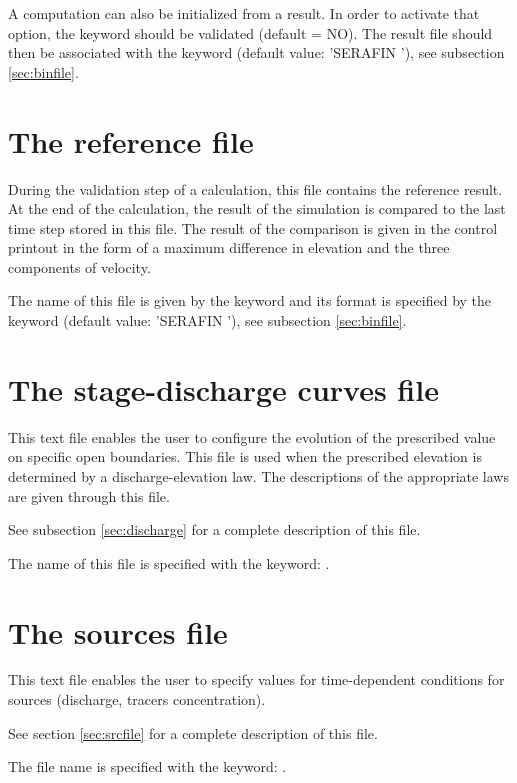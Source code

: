 A computation can also be initialized from a  result. In order to
activate that option, the  keyword
should be validated (default = NO).
The  result file should then be associated with
the  keyword (default
value: 'SERAFIN '), see subsection \ref{sec:binfile}.


\section{The reference file}

During the validation step of a calculation, this file contains the reference
result.
At the end of the calculation, the result of the simulation is compared to the
last time step stored in this file. The result of the comparison is given in
the control printout in the form of a maximum difference in elevation and the
three components of velocity.

The name of this file is given by the keyword  and its
format is specified by the keyword  (default
value: 'SERAFIN '), see subsection \ref{sec:binfile}.


\section{The stage-discharge curves file}

This text file enables the user to configure the evolution of the prescribed
value on specific open boundaries. This file is used when the prescribed
elevation is determined by a discharge-elevation law. The descriptions of the
appropriate laws are given through this file.

See subsection \ref{sec:discharge} for a complete description of this file.

The name of this file is specified with the keyword: .


\section{The sources file}

This text file enables the user to specify values for time-dependent conditions
for sources (discharge, tracers concentration).

See section \ref{sec:srcfile} for a complete description of this file.

The file name is specified with the keyword: .


